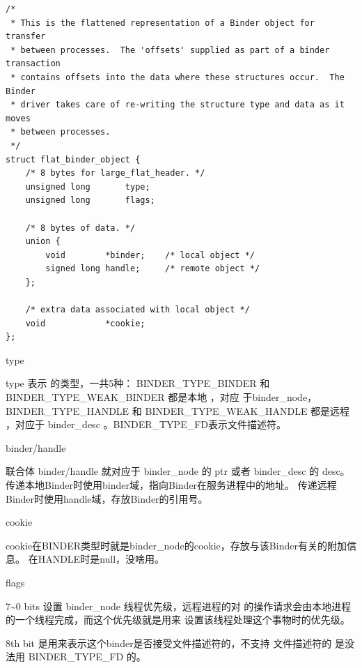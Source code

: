 \documentclass[a4paper,11pt]{article}
\begin{document}
\begin{lstlisting}[caption={flat\_binder\_object}, label=flatbinderobject]
/*
 * This is the flattened representation of a Binder object for transfer
 * between processes.  The 'offsets' supplied as part of a binder transaction
 * contains offsets into the data where these structures occur.  The Binder
 * driver takes care of re-writing the structure type and data as it moves
 * between processes.
 */
struct flat_binder_object {
	/* 8 bytes for large_flat_header. */
	unsigned long		type;
	unsigned long		flags;

	/* 8 bytes of data. */
	union {
		void		*binder;	/* local object */
		signed long	handle;		/* remote object */
	};

	/* extra data associated with local object */
	void			*cookie;
};

\end{lstlisting}

\begin{description*}
    \item [type]
        
        type 表示 \binder 的类型，一共5种：
         BINDER_TYPE_BINDER 和 BINDER_TYPE_WEAK_BINDER 都是本地 \binder，对应
         于binder_node，BINDER_TYPE_HANDLE 和 BINDER_TYPE_WEAK_HANDLE 都是远程
         \binder ，对应于 binder_desc 。BINDER_TYPE_FD表示文件描述符。
    \item [binder/handle]
        
        联合体 binder/handle 就对应于 binder_node 的 ptr 或者 binder_desc 的
        desc。传递本地Binder时使用binder域，指向Binder在服务进程中的地址。
        传递远程Binder时使用handle域，存放Binder的引用号。

    \item [cookie] 
        
        cookie在BINDER类型时就是binder_node的cookie，存放与该Binder有关的附加信息。
        在HANDLE时是null，没啥用。

    \item [flags]
        
            7\~{}0 bits 设置 binder_node 线程优先级，远程进程的对 \binder
            的操作请求会由\binder 本地进程的一个线程完成，而这个优先级就是用来
            设置该线程处理这个\binder 事物时的优先级。

            8th bit 是用来表示这个binder是否接受文件描述符的，不支持
            文件描述符的 \binder 是没法用 BINDER_TYPE_FD 的。
\end{description*}
\end{document}
